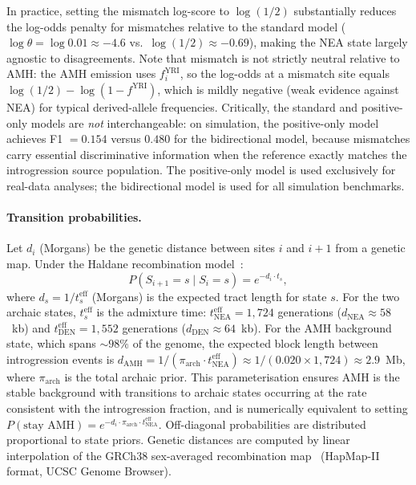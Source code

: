 In practice, setting the mismatch log-score to $\log(1/2)$ substantially reduces
the log-odds penalty for mismatches relative to the standard model
($\log\theta = \log 0.01 \approx -4.6$ vs.\ $\log(1/2) \approx -0.69$),
making the NEA state largely agnostic to disagreements.
Note that mismatch is not strictly neutral relative to AMH:
the AMH emission uses $f^\mathrm{YRI}_i$, so the log-odds at a mismatch site equals
$\log(1/2) - \log(1 - f^\mathrm{YRI})$, which is mildly negative (weak evidence
against NEA) for typical derived-allele frequencies.
Critically, the standard and positive-only models are \emph{not} interchangeable:
on simulation, the positive-only model achieves F1 $= 0.154$ versus $0.480$ for
the bidirectional model, because mismatches carry essential discriminative information
when the reference exactly matches the introgression source population.
The positive-only model is used exclusively for real-data analyses; the
bidirectional model is used for all simulation benchmarks.

\paragraph{Transition probabilities.}
Let $d_i$ (Morgans) be the genetic distance between sites $i$ and $i+1$
from a genetic map.
Under the Haldane recombination model~\citep{price2009sensitive}:
\begin{equation}
  P(S_{i+1} = s \mid S_i = s) = e^{-d_i \cdot t_s},
  \label{eq:trans}
\end{equation}
where $d_s = 1/t_s^\mathrm{eff}$ (Morgans) is the expected tract length for state $s$.
For the two archaic states, $t_s^\mathrm{eff}$ is the admixture time:
$t_\mathrm{NEA}^\mathrm{eff} = 1{,}724$ generations ($d_\mathrm{NEA} \approx 58$~kb)
and $t_\mathrm{DEN}^\mathrm{eff} = 1{,}552$ generations ($d_\mathrm{DEN} \approx 64$~kb).
For the AMH background state, which spans ${\sim}98\%$ of the genome, the
expected block length between introgression events is
$d_\mathrm{AMH} = 1/(\pi_\mathrm{arch} \cdot t_\mathrm{NEA}^\mathrm{eff})
\approx 1/(0.020 \times 1{,}724) \approx 2.9$~Mb,
where $\pi_\mathrm{arch}$ is the total archaic prior.
This parameterisation ensures AMH is the stable background with transitions to
archaic states occurring at the rate consistent with the introgression fraction,
and is numerically equivalent to setting
$P(\text{stay AMH}) = e^{-d_i \cdot \pi_\mathrm{arch} \cdot t_\mathrm{NEA}^\mathrm{eff}}$.
Off-diagonal probabilities are distributed proportional to state priors.
Genetic distances are computed by linear interpolation of the GRCh38
sex-averaged recombination map~\citep{halldorsson2019characterizing}
(HapMap-II format, UCSC Genome Browser).

